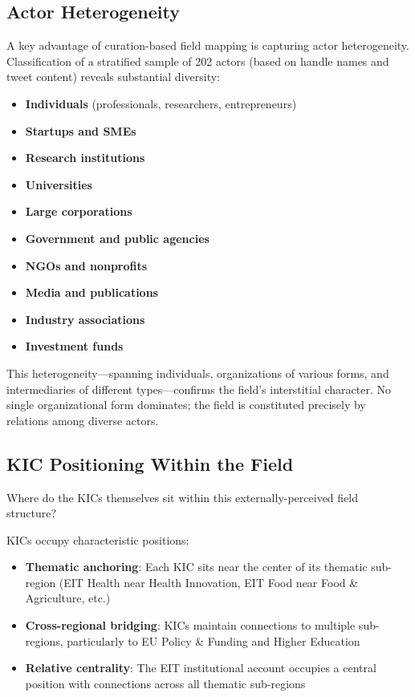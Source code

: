 \documentclass[../main.tex]{subfiles}
\begin{document}
\subsection{Actor Heterogeneity}

A key advantage of curation-based field mapping is capturing actor heterogeneity. Classification of a stratified sample of 202 actors (based on handle names and tweet content) reveals substantial diversity:

\begin{itemize}
    \item \textbf{Individuals} (professionals, researchers, entrepreneurs)
    \item \textbf{Startups and SMEs}
    \item \textbf{Research institutions}
    \item \textbf{Universities}
    \item \textbf{Large corporations}
    \item \textbf{Government and public agencies}
    \item \textbf{NGOs and nonprofits}
    \item \textbf{Media and publications}
    \item \textbf{Industry associations}
    \item \textbf{Investment funds}
\end{itemize}

This heterogeneity---spanning individuals, organizations of various forms, and intermediaries of different types---confirms the field's interstitial character. No single organizational form dominates; the field is constituted precisely by relations among diverse actors.


\subsection{KIC Positioning Within the Field}

Where do the KICs themselves sit within this externally-perceived field structure?

KICs occupy characteristic positions:

\begin{itemize}
    \item \textbf{Thematic anchoring}: Each KIC sits near the center of its thematic sub-region (EIT Health near Health Innovation, EIT Food near Food \& Agriculture, etc.)
    \item \textbf{Cross-regional bridging}: KICs maintain connections to multiple sub-regions, particularly to EU Policy \& Funding and Higher Education
    \item \textbf{Relative centrality}: The EIT institutional account occupies a central position with connections across all thematic sub-regions
\end{itemize}
\end{document}
